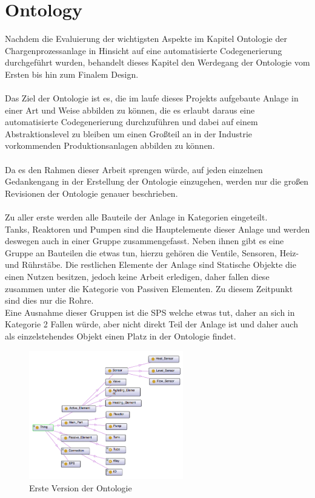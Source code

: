 \section{Ontology}
Nachdem die Evaluierung der wichtigsten Aspekte im Kapitel Ontologie der Chargenprozessanlage in Hinsicht auf eine automatisierte Codegenerierung durchgeführt wurden, behandelt dieses Kapitel den Werdegang der Ontologie vom Ersten bis hin zum Finalem Design.\\
\\
Das Ziel der Ontologie ist es, die im laufe dieses Projekts aufgebaute Anlage in einer Art und Weise abbilden zu können, die es erlaubt daraus eine automatisierte Codegenerierung durchzuführen und dabei auf einem Abstraktionslevel zu bleiben um einen Großteil an in der Industrie vorkommenden Produktionsanlagen abbilden zu können.\\
\\
Da es den Rahmen dieser Arbeit sprengen würde, auf jeden einzelnen Gedankengang in der Erstellung der Ontologie einzugehen, werden nur die großen Revisionen der Ontologie genauer beschrieben.\\
\\
Zu aller erste werden alle Bauteile der Anlage in Kategorien eingeteilt.\\
Tanks, Reaktoren und Pumpen sind die Hauptelemente dieser Anlage und werden deswegen auch in einer Gruppe zusammengefasst. Neben ihnen gibt es eine Gruppe an Bauteilen die etwas tun, hierzu gehören die Ventile, Sensoren, Heiz- und Rührstäbe. Die restlichen Elemente der Anlage sind Statische Objekte die einen Nutzen besitzen, jedoch keine Arbeit erledigen, daher fallen diese zusammen unter die Kategorie von Passiven Elementen. Zu diesem Zeitpunkt sind dies nur die Rohre.\\
Eine Ausnahme dieser Gruppen ist die SPS welche etwas tut, daher an sich in Kategorie 2 Fallen würde, aber nicht direkt Teil der Anlage ist und daher auch als einzelstehendes Objekt einen Platz in der Ontologie findet.

\begin{figure}[hbt!]
  \centering
  \includegraphics[width=0.6\textwidth]{graphics/implementation/Ontology_v1}
  \caption{Erste Version der Ontologie}
\end{figure}

